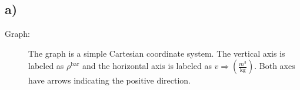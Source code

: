 

\subsection*{a)}
\begin{description}
    \item[Graph:] The graph is a simple Cartesian coordinate system. The vertical axis is labeled as $\rho^{\text{bar}}$ and the horizontal axis is labeled as $v \Rightarrow \left( \frac{m^3}{\text{kg}} \right)$. Both axes have arrows indicating the positive direction.
\end{description}